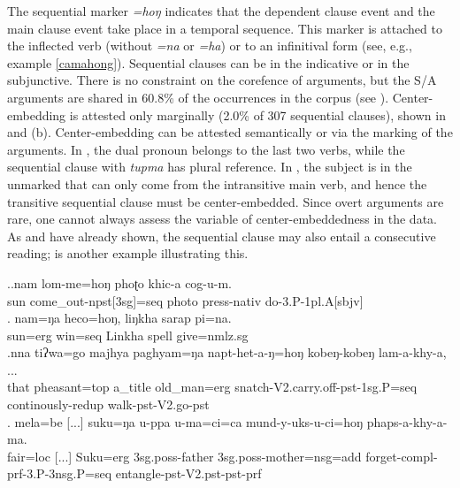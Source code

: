 The sequential marker \emph{=hoŋ}  indicates that the dependent clause event and the main clause event take place in a temporal sequence.  This  marker is attached to the  inflected verb (without \emph{=na} or \emph{=ha}) or to an infinitival form (see, e.g., example \ref{camahong}). Sequential clauses can be in the indicative or in the subjunctive. There is no constraint on the corefence of arguments, but the S/A arguments are shared in 60.8\% of the occurrences in the corpus (see \Next). Center-embedding is attested only marginally (2.0\% of 307 sequential clauses), shown in \NNext[a] and (b). Center-embedding can be attested semantically or via the  marking of the arguments. In \NNext[a], the dual pronoun belongs to the last two verbs, while the sequential clause with \emph{tupma}  has plural reference. In \NNext[b], the subject is in the unmarked  that can only come from the intransitive main verb, and hence the transitive sequential clause must be center-embedded. Since overt arguments are rare, one cannot always assess the variable of center-embeddedness in the data. As \Next[b] and \NNext[b] have already shown, the sequential clause may also entail a consecutive reading; \NNext[c] is another example illustrating this.
	
	\ex.\ag.nam lom-me=hoŋ phoʈo khic-a cog-u-m.\\
	sun come\_out{\sc -npst[3sg]=seq} photo press{\sc -nativ} do{\sc -3.P-1pl.A[sbjv]}\\
	\bg.         nam=ŋa   heco=hoŋ,                        liŋkha   sarap pi=na.\\
	sun{\sc =erg} win{\sc [pst;3.P]=seq} Linkha spell give{\sc [pst;3.P]=nmlz.sg}\\
	 
	\bg.nna  tiʔwa=go       majhya                 paghyam=ŋa   napt-het-a-ŋ=hoŋ                         kobeŋ-kobeŋ       lam-a-khy-a, ...\\
	that pheasant{\sc =top} a\_title  old\_man{\sc =erg} snatch{\sc -V2.carry.off-pst-1sg.P=seq} continously-{\sc redup} walk{\sc [3sg]-pst-V2.go-pst}\\
	 
\bg.   mela=be [...] suku=ŋa     u-ppa             u-ma=ci=ca                        mund-y-uks-u-ci=hoŋ                           phaps-a-khy-a-ma.\\
fair{\sc =loc} [...] Suku{\sc =erg} {\sc 3sg.poss-}father {\sc 3sg.poss-}mother{\sc =nsg=add} forget{\sc -compl-prf-3.P-3nsg.P=seq} entangle{\sc [3sg]-pst-V2.pst-pst-prf}\\
 


